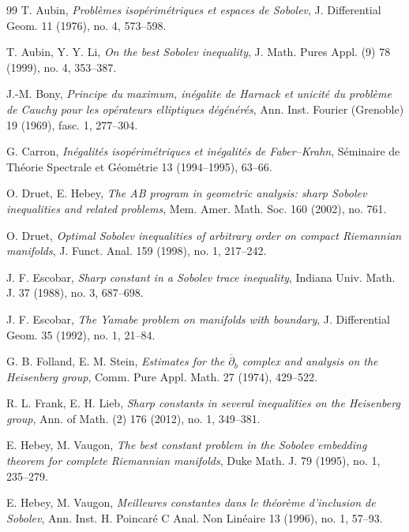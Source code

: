 \documentclass[11pt]{article}
\numberwithin{equation}{section}
\newcounter{problem}
\numberwithin{equation}{section}
\begin{document}
	
	\begin{thebibliography}{99}\small
		T. Aubin, 
		\emph{Probl\`emes isop\'erim\'etriques et espaces de {S}obolev}, J. Differential Geom. 11 (1976), no. 4, 573--598.
		
		T. Aubin, Y. Y. Li, 
		\emph{On the best Sobolev inequality},
		J. Math. Pures Appl. (9) 78 (1999), no. 4, 353--387.
		
		J.-M. Bony, 
		\emph{Principe du maximum, in\'egalite de Harnack et unicit\'e du probl\`eme de Cauchy pour les op\'erateurs elliptiques d\'eg\'en\'er\'es}, Ann. Inst. Fourier (Grenoble) 19 (1969), fasc. 1, 277--304.
		
		G. Carron, 
		\emph{In\'egalit\'es isop\'erim\'etriques et in\'egalit\'es de Faber--Krahn},
		S\'eminaire de Th\'eorie Spectrale et G\'eom\'etrie 13 (1994--1995), 63--66.
		
		O. Druet, E. Hebey, 
		\emph{The AB program in geometric analysis: sharp Sobolev inequalities and related problems},
		Mem. Amer. Math. Soc. 160 (2002), no. 761.
		
		O. Druet, 
		\emph{Optimal Sobolev inequalities of arbitrary order on compact Riemannian manifolds},
		J. Funct. Anal. 159 (1998), no. 1, 217--242.
		
		J. F. Escobar, 
		\emph{Sharp constant in a Sobolev trace inequality},
		Indiana Univ. Math. J. 37 (1988), no. 3, 687--698.
		
		J. F. Escobar, 
		\emph{The Yamabe problem on manifolds with boundary},
		J. Differential Geom. 35 (1992), no. 1, 21--84.
		
		
		G. B. Folland, E. M. Stein, 
		\emph{Estimates for the \(\overline \partial_{b}\) complex and analysis on the Heisenberg group}, Comm. Pure Appl. Math. 27 (1974), 429--522.

		R. L. Frank, E. H. Lieb,
		\emph{Sharp constants in several inequalities on the Heisenberg group},
		Ann. of Math. (2) 176 (2012), no. 1, 349--381.
		
		E. Hebey, M. Vaugon, 
		\emph{The best constant problem in the Sobolev embedding theorem for complete Riemannian manifolds},
		Duke Math. J. 79 (1995), no. 1, 235--279.
		
		E. Hebey, M. Vaugon, 
		\emph{Meilleures constantes dans le th\'eor\`eme d'inclusion de {S}obolev}, Ann. Inst. H. Poincar\'e{} C Anal. Non Lin\'eaire 13 (1996), no. 1, 57--93.
		

\end{thebibliography}
\end{document}
